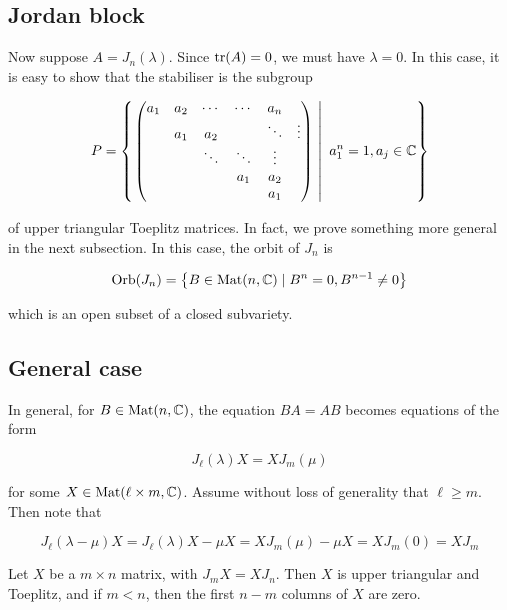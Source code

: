 \documentclass{article}
\begin{document}
\subsection{Jordan block}

Now suppose \(A = J_n(\lambda)\). Since \(\tr(A) = 0\), we must have \(\lambda = 0\). In this case, it is easy to show that the stabiliser is the subgroup

\[P = \left\{\left.\begin{pmatrix}
    a_1 & a_2 & \cdots & \cdots & a_n \\
    & a_1 & a_2 & &\ddots & \vdots \\
    & & \ddots & \ddots & \vdots \\
    & & & a_1 & a_2 \\
    & & & & a_1
\end{pmatrix}\ \right\vert\ a_1^n = 1, a_j \in \mathbb{C} \right\}\]

of upper triangular Toeplitz matrices. In fact, we prove something more general in the next subsection. In this case, the orbit of \(J_n\) is

\[\operatorname{Orb}(J_n) = \left\{B \in \operatorname{Mat}(n, \mathbb{C}) \mid B^n = 0, B^{n-1} \ne 0\right\}\]

which is an open subset of a closed subvariety.

\subsection{General case}

In general, for \(B \in \operatorname{Mat}(n, \mathbb{C})\), the equation \(BA = AB\) becomes equations of the form

\[J_\ell(\lambda)X = XJ_m(\mu)\]

for some \(X \in \operatorname{Mat}(\ell \times m, \mathbb{C})\). Assume without loss of generality that \(\ell \ge m\). Then note that

\[J_\ell(\lambda - \mu)X = J_\ell(\lambda)X - \mu X = XJ_m(\mu) - \mu X = XJ_m(0) = X J_m\]

\begin{lemma*}
    Let \(X\) be a \(m \times n\) matrix, with \(J_mX = XJ_n\). Then \(X\) is upper triangular and Toeplitz, and if \(m < n\), then the first \(n - m\) columns of \(X\) are zero.
\end{lemma*}
\end{document}
